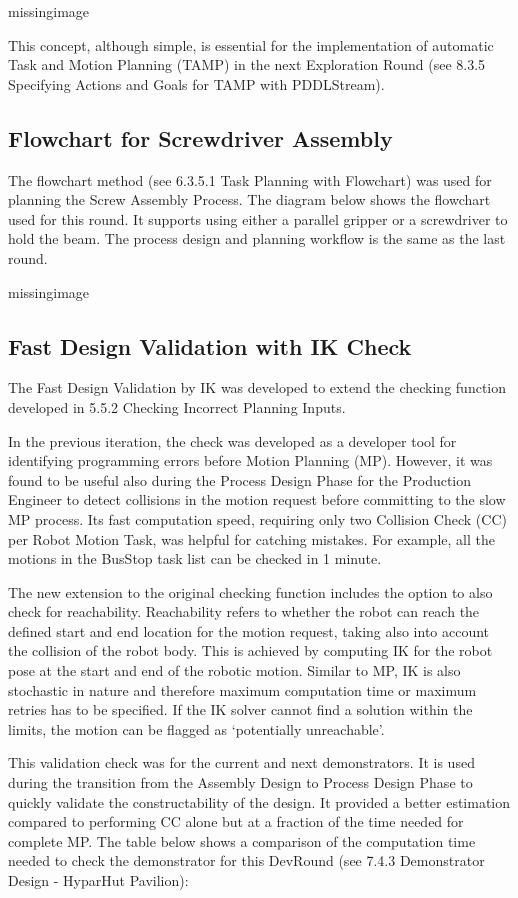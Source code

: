 missingimage

This concept, although simple, is essential for the implementation of automatic Task and Motion Planning (TAMP) in the next Exploration Round (see 8.3.5 Specifying Actions and Goals for TAMP with PDDLStream).

\subsection{Flowchart for Screwdriver Assembly}

The flowchart method (see 6.3.5.1 Task Planning with Flowchart) was used for planning the Screw Assembly Process. The diagram below shows the flowchart used for this round. It supports using either a parallel gripper or a screwdriver to hold the beam. The process design and planning workflow is the same as the last round.

missingimage

\subsection{Fast Design Validation with IK Check}
The Fast Design Validation by IK was developed to extend the checking function developed in 5.5.2 Checking Incorrect Planning Inputs. 

In the previous iteration, the check was developed as a developer tool for identifying programming errors before Motion Planning (MP). However, it was found to be useful also during the Process Design Phase for the Production Engineer to detect collisions in the motion request before committing to the slow MP process. Its fast computation speed, requiring only two Collision Check (CC) per Robot Motion Task, was helpful for catching mistakes. For example, all the motions in the BusStop task list can be checked in 1 minute. 

The new extension to the original checking function includes the option to also check for reachability. Reachability refers to whether the robot can reach the defined start and end location for the motion request, taking also into account the collision of the robot body. This is achieved by computing IK for the robot pose at the start and end of the robotic motion. Similar to MP, IK is also stochastic in nature and therefore maximum computation time or maximum retries has to be specified. If the IK solver cannot find a solution within the limits, the motion can be flagged as ‘potentially unreachable’.

This validation check was for the current and next demonstrators. It is used during the transition from the Assembly Design to Process Design Phase to quickly validate the constructability of the design. It provided a better estimation compared to performing CC alone but at a fraction of the time needed for complete MP. The table below shows a comparison of the computation time needed to check the demonstrator for this DevRound (see 7.4.3 Demonstrator Design  - HyparHut Pavilion):

